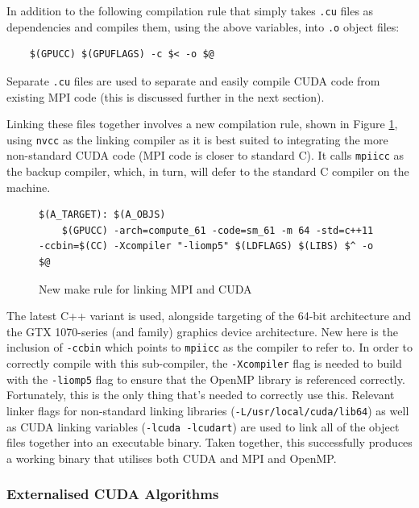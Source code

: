 \documentclass[conference]{IEEEtran}
\begin{document}
In addition to the following compilation rule that simply takes \texttt{.cu} files as dependencies and compiles them, using the above variables, into \texttt{.o} object files:

\begin{lstlisting}[breaklines]
%.o: %.cu
    $(GPUCC) $(GPUFLAGS) -c $< -o $@
\end{lstlisting}

Separate \texttt{.cu} files are used to separate and easily compile CUDA code from existing MPI code (this is discussed further in the next section).

Linking these files together involves a new compilation rule, shown in Figure \ref{fig:nvccmpiicc}, using \texttt{nvcc} as the linking compiler as it is best suited to integrating the more non-standard CUDA code (MPI code is closer to standard C). It calls \texttt{mpiicc} as the backup compiler, which, in turn, will defer to the standard C compiler on the machine.

\begin{figure}[!h]
    \centering
    \begin{lstlisting}[breaklines]
$(A_TARGET): $(A_OBJS)
    $(GPUCC) -arch=compute_61 -code=sm_61 -m 64 -std=c++11 -ccbin=$(CC) -Xcompiler "-liomp5" $(LDFLAGS) $(LIBS) $^ -o $@
    \end{lstlisting}
    \caption{New make rule for linking MPI and CUDA}
    \label{fig:nvccmpiicc}
\end{figure}

The latest C++ variant is used, alongside targeting of the 64-bit architecture and the GTX 1070-series (and family) graphics device architecture. New here is the inclusion of \texttt{-ccbin} which points to \texttt{mpiicc} as the compiler to refer to. In order to correctly compile with this sub-compiler, the \texttt{-Xcompiler} flag is needed to build with the \texttt{-liomp5} flag to ensure that the OpenMP library is referenced correctly. Fortunately, this is the only thing that's needed to correctly use this. Relevant linker flags for non-standard linking libraries (\texttt{-L/usr/local/cuda/lib64}) as well as CUDA linking variables (\texttt{-lcuda -lcudart}) are used to link all of the object files together into an executable binary. Taken together, this successfully produces a working binary that utilises both CUDA and MPI and OpenMP.

\subsubsection{Externalised CUDA Algorithms}
\end{document}
